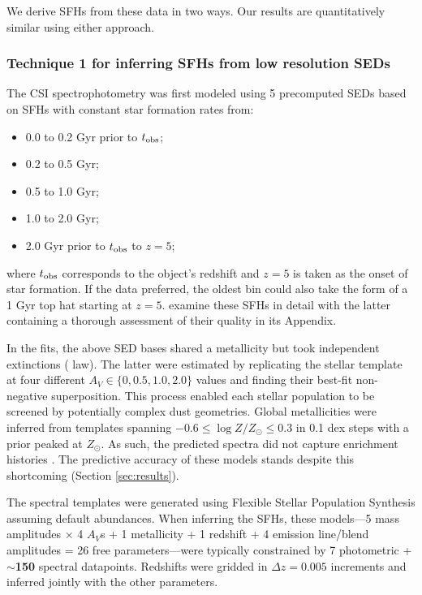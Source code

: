 \documentclass[a4paper,fleqn,usenatbib]{mnras}
\newcommand{\logZ}{\log Z/Z_{\odot}}
\newcommand{\bfr}{\bf\color{red}}
\newcommand{\tobs}{t_{\rm obs}}
\newcommand{\bitem}{\begin{itemize}}
\newcommand{\eitem}{\end{itemize}}
\begin{document}
We derive SFHs from these data in two ways. Our results are quantitatively similar
using either approach.


\subsubsection{Technique 1 for inferring SFHs from low resolution SEDs}
\label{sec:blocks}

The CSI spectrophotometry was first modeled using 5 precomputed SEDs based on SFHs with 
constant star formation rates from:
\bitem
	\item 0.0 to 0.2 Gyr prior to $\tobs$;
	\item 0.2 to 0.5 Gyr;%
	\item 0.5 to 1.0 Gyr;%
	\item 1.0 to 2.0 Gyr;%
	\item 2.0 Gyr prior to $\tobs$ to $z=5$;
\eitem
where $\tobs$ corresponds to the object's redshift and $z=5$ is taken as the onset of star formation. 
If the data preferred, the oldest bin could also take the form of a 1 Gyr top hat starting at $z=5$. 
\citet{Dressler16, Dressler18} examine these SFHs in detail with the latter containing a thorough 
assessment of their quality in its Appendix.

In the fits, the above SED bases shared a metallicity but took independent extinctions 
(\citealt{Calzetti00} law). The latter were estimated by replicating the stellar template 
at four different {\bfr $A_{V}\in\{0,0.5,1.0,2.0\}$} values and finding their best-fit non-negative
superposition. This process enabled each stellar population to be screened by potentially complex 
dust geometries. Global metallicities were inferred from templates spanning 
$-0.6\leq\logZ\leq0.3$ in 0.1 dex steps with a prior peaked at $Z_{\odot}$. 
As such, the predicted spectra did not capture enrichment histories 
\citep[cf.][]{Pacifici12, Morishita19}. The predictive accuracy of these models stands despite 
this shortcoming (Section \ref{sec:results}).

The spectral templates were generated using Flexible Stellar Population Synthesis 
\citep[FSPS;][]{ConroyGunnWhite09} assuming default abundances. When inferring the SFHs, 
these models---5 mass amplitudes $\times$ 4 $A_{V}$s + 1 metallicity + 1 redshift + 
4 emission line/blend amplitudes = 26 free parameters---were typically constrained by 
7 photometric + {\bfr $\sim$150} spectral datapoints. Redshifts were gridded in $\Delta z = 0.005$ 
increments and inferred jointly with the other parameters.
\end{document}
